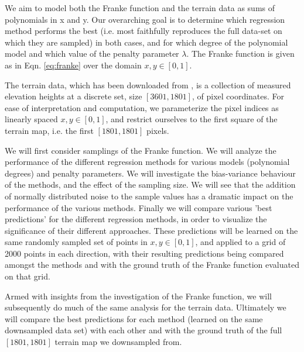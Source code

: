 \documentclass[reprint, english, nofootinbib]{revtex4-2}
\begin{document}
We aim to model both the Franke function and the terrain data as sums of polynomials in x and y. Our overarching goal is to determine which regression method performs the best (i.e. most faithfully reproduces the full data-set on which they are sampled) in both cases, and for which degree of the polynomial model and which value of the penalty parameter $\lambda$. The Franke function is given as in Eqn. \ref{eq:franke} over the domain $x,y \in [0,1]$.

The terrain data,  which has been downloaded from \cite{4155_repo}, is a collection of measured elevation heights at a discrete set, size $[3601,1801]$, of pixel coordinates. For ease of interpretation and computation, we parameterize the pixel indices as linearly spaced $x,y \in [0,1]$, and restrict ourselves to the first square of the terrain map, i.e. the first $[1801,1801]$ pixels.


We will first consider samplings of the Franke function. We will analyze the performance of the different regression methods for various models (polynomial degrees) and penalty parameters. We will investigate the bias-variance behaviour of the methods, and the effect of the sampling size. We will see that the addition of normally distributed noise to the sample values has a dramatic impact on the performance of the various methods. Finally we will compare various 'best predictions' for the different regression methods, in order to visualize the significance of their different approaches. These predictions will be learned on the same randomly sampled set of points in $x,y \in [0,1]$, and applied to a grid of 2000 points in each direction, with their resulting predictions being compared amongst the methods and with the ground truth of the Franke function evaluated on that grid.

Armed with insights from the investigation of the Franke function, we will subsequently do much of the same analysis for the terrain data. Ultimately we will compare the best predictions for each method (learned on the same downsampled data set) with each other and with the ground truth of the full $[1801,1801]$ terrain map we downsampled from.


\end{document}
